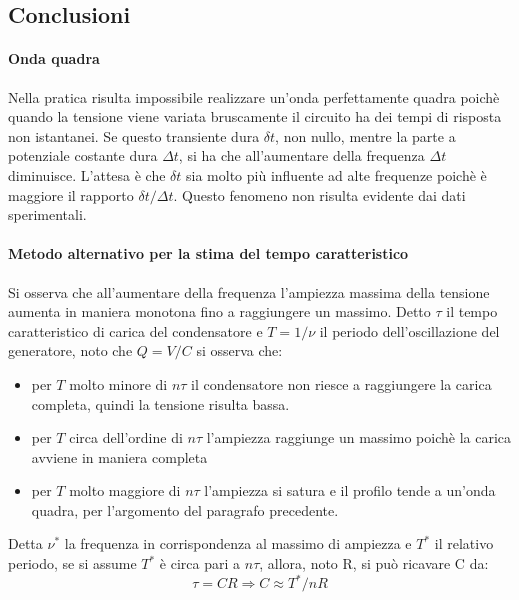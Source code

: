 \subsection{Conclusioni}
\label{sec:C3_final}

\paragraph{Onda quadra}{ Nella pratica risulta impossibile realizzare un'onda perfettamente quadra poichè quando la tensione viene variata bruscamente il circuito ha dei tempi di risposta non istantanei. Se questo transiente dura $\delta t$, non nullo, mentre la parte a potenziale costante dura $\Delta t$, si ha che all'aumentare della frequenza  $\Delta t$ diminuisce. L'attesa è che $\delta t$ sia molto più influente ad alte frequenze poichè è maggiore il rapporto $\delta t/\Delta t$. Questo fenomeno non risulta evidente dai dati sperimentali.}
%
%
%
\paragraph{Metodo alternativo per la stima del tempo caratteristico}{Si osserva che all'aumentare della frequenza l'ampiezza massima della tensione aumenta in maniera monotona fino a raggiungere un massimo. Detto $\tau$ il tempo caratteristico di carica del condensatore e $T = 1/\nu$ il periodo dell'oscillazione del generatore, noto che $Q=V/C$ si osserva che:
\begin{itemize}
    \item per $T$ molto minore di $n\tau$ il condensatore non riesce a raggiungere la carica completa, quindi la tensione risulta bassa.
    \item per $T$ circa dell'ordine di $n\tau$ l'ampiezza raggiunge un massimo poichè la carica avviene in maniera completa
    \item per $T$ molto maggiore di $n\tau$ l'ampiezza si satura e il profilo tende a un'onda quadra, per l'argomento del paragrafo precedente.
\end{itemize}
Detta $\nu^*$ la frequenza in corrispondenza al massimo di ampiezza e $T^*$ il relativo periodo, se si assume $T^*$  è circa pari a $n\tau$, allora, noto R, si può ricavare C da:
    $$\tau =  CR \Rightarrow C \approx T^*/nR $$ }
%
